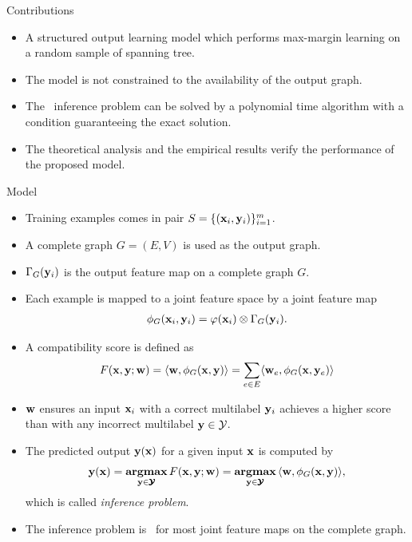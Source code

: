 \documentclass[first=dgreen,second=purple,logo=yellowexc]{aaltoslides}
\begin{document}
%
\begin{frame}{Contributions}
	\begin{itemize}
		\item A structured output learning model which performs max-margin learning on a random sample of spanning tree.
		\item The model is not constrained to the availability of the output graph.
		\item The \nphard\ inference problem can be solved by a polynomial time algorithm with a condition guaranteeing the exact solution.
		\item The theoretical analysis and the empirical results verify the performance of the proposed model.
	\end{itemize}
\end{frame}



%
\begin{frame}[allowframebreaks]{Model}
	\begin{itemize}
		\item Training examples comes in pair $S=\{(\mathbf {x}_i,\mathbf {y}_i)\}_{i=1}^{m}$.
		\item A complete graph $G=(E,V)$ is used as the output graph.
		\item $\Gamma_G(\mathbf {y}_i)$ is the output feature map on a complete graph $G$.
		\item Each example is mapped to a joint feature space by a joint feature map
		\begin{align*}
			\phi_G(\mathbf {x}_i,\mathbf {y}_i) = \varphi(\mathbf {x}_i)\otimes\Gamma_G(\mathbf {y}_i).
		\end{align*}
		\item A compatibility score is defined as
		\begin{align*}
			F(\mathbf {x},\mathbf {y};\mathbf {w}) = \langle \mathbf {w}, \phi_G(\mathbf {x},\mathbf {y}) \rangle=\sum_{e\in E}\langle \mathbf {w}_e, \phi_G(\mathbf {x},\mathbf {y}_{e}) \rangle
		\end{align*} 
		\item $\mathbf {w}$ ensures an input $\mathbf {x}_i$ with a correct multilabel $\mathbf {y}_i$ achieves a higher score than with any incorrect multilabel $\mathbf {y}\in\mathcal{Y}$.
		\item The predicted output $\mathbf {y}(\mathbf {x})$ for a given input $\mathbf {x}$ is computed by
		\begin{align*}
			\mathbf {y}(\mathbf {x}) = \underset{\mathbf {y}\in\pmb {\mathcal{Y}}}{\textbf{argmax}}\,F(\mathbf {x},\mathbf {y};\mathbf {w}) = \underset{\mathbf {y}\in\pmb {\mathcal{Y}}}{\textbf{argmax}}\,\langle \mathbf {w}, \phi_G(\mathbf {x},\mathbf {y}) \rangle,
		\end{align*}
		which is called \textit{inference problem}.
		\item The {inference problem} is \nphard\ for most joint feature maps on the complete graph.
	\end{itemize}
\end{frame}
\end{document}
